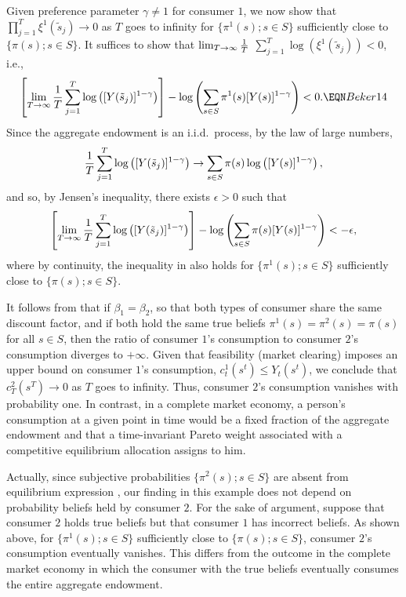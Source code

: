 Given  preference parameter $\gamma\neq 1$ for consumer $1$,
we now show that $\prod_{j=1}^{T} \xi^1(\tilde s_j) \rightarrow 0$ as $T$
goes to infinity for $\{\pi^1(s); s\in S\}$ sufficiently close
to $\{\pi(s); s\in S\}$. It suffices to show that
$\lim_{T\to\infty} {1 \over T}$
$ \sum_{j=1}^{T} \log( \xi^1(\tilde s_j)) <0$,
i.e.,
$$
\left[
\lim_{T\to\infty} {1 \over T} \sum_{j=1}^{T}
\log\left( [Y(\tilde s_j)]^{1-\gamma}  \right) \right]
- \log\left( \sum_{s\in S} \pi^1(s) [Y(s)]^{1-\gamma} \right) <0.  \EQN Beker14
$$
Since the aggregate endowment is an i.i.d.\ process, by the law of
large numbers,
$$
{1 \over T} \sum_{j=1}^{T} \log\left( [Y(\tilde s_j)]^{1-\gamma}  \right)
\rightarrow
\sum_{s\in S} \pi(s) \log \left( [Y(s)]^{1-\gamma} \right),     %
$$
and so, by Jensen's inequality, there exists $\epsilon >0$ such that
$$
\left[
\lim_{T\to\infty} {1 \over T} \sum_{j=1}^{T}
\log\left( [Y(\tilde s_j)]^{1-\gamma}  \right) \right]
- \log\left( \sum_{s\in S} \pi(s) [Y(s)]^{1-\gamma} \right) < -\epsilon,
$$
where by continuity, the inequality  in  also holds for
$\{\pi^1(s); s\in S\}$ sufficiently close to $\{\pi(s); s\in S\}$.

It follows from  that if  $\beta_1=\beta_2$, so that  both types of  consumer share the same
discount factor,  and if both  hold the same true beliefs
$\pi^1(s)=\pi^2(s)=\pi(s)$ for all $s\in S$, then the ratio of consumer
$1$'s consumption to consumer $2$'s consumption diverges to $+ \infty$.
Given that feasibility (market clearing) imposes an upper bound on
consumer $1$'s consumption, $c^1_t(s^t) \leq Y_t(s^t)$, we conclude that
$c^2_T(s^T) \rightarrow 0$ as $T$ goes to infinity. Thus, 
consumer $2$'s consumption vanishes with probability one. In contrast, in a complete
market economy, a person's consumption at a given point in  time  would  be a fixed fraction of  the aggregate endowment
 and that a  time-invariant Pareto weight associated with a  competitive equilibrium allocation assigns to him.

Actually,  since subjective
probabilities $\{\pi^2(s); s\in S\}$ are absent from equilibrium
expression ,  our finding in this example does not depend
on probability  beliefs held by consumer $2$. For the sake of  argument, suppose
that consumer $2$ holds  true beliefs but that consumer $1$ has incorrect
beliefs. As shown above, for
$\{\pi^1(s); s\in S\}$ sufficiently close to $\{\pi(s); s\in S\}$,
consumer $2$'s consumption  eventually vanishes.
This  differs from the outcome in the  complete market
economy in which  the consumer with the true beliefs  eventually consumes the
entire aggregate endowment.

